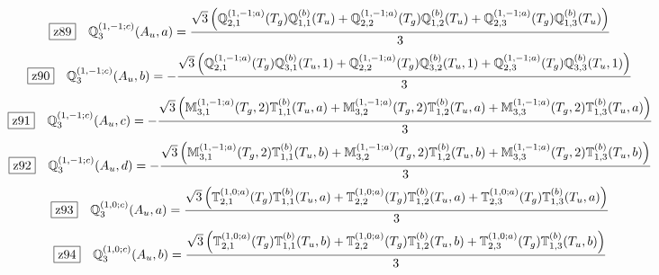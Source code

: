 \documentclass[fleqn,10pt,landscape]{jsarticle}
\begin{document}
\begin{dmath*}
\hspace*{3mm}\fbox{z89}\quad \mathbb{Q}_{3}^{(1,-1;c)}(A_{u},a)=\frac{\sqrt{3} \left(\mathbb{Q}_{2,1}^{(1,-1;a)}(T_{g}) \mathbb{Q}_{1,1}^{(b)}(T_{u}) + \mathbb{Q}_{2,2}^{(1,-1;a)}(T_{g}) \mathbb{Q}_{1,2}^{(b)}(T_{u}) + \mathbb{Q}_{2,3}^{(1,-1;a)}(T_{g}) \mathbb{Q}_{1,3}^{(b)}(T_{u})\right)}{3}
\end{dmath*}
\begin{dmath*}
\hspace*{3mm}\fbox{z90}\quad \mathbb{Q}_{3}^{(1,-1;c)}(A_{u},b)=- \frac{\sqrt{3} \left(\mathbb{Q}_{2,1}^{(1,-1;a)}(T_{g}) \mathbb{Q}_{3,1}^{(b)}(T_{u},1) + \mathbb{Q}_{2,2}^{(1,-1;a)}(T_{g}) \mathbb{Q}_{3,2}^{(b)}(T_{u},1) + \mathbb{Q}_{2,3}^{(1,-1;a)}(T_{g}) \mathbb{Q}_{3,3}^{(b)}(T_{u},1)\right)}{3}
\end{dmath*}
\begin{dmath*}
\hspace*{3mm}\fbox{z91}\quad \mathbb{Q}_{3}^{(1,-1;c)}(A_{u},c)=- \frac{\sqrt{3} \left(\mathbb{M}_{3,1}^{(1,-1;a)}(T_{g},2) \mathbb{T}_{1,1}^{(b)}(T_{u},a) + \mathbb{M}_{3,2}^{(1,-1;a)}(T_{g},2) \mathbb{T}_{1,2}^{(b)}(T_{u},a) + \mathbb{M}_{3,3}^{(1,-1;a)}(T_{g},2) \mathbb{T}_{1,3}^{(b)}(T_{u},a)\right)}{3}
\end{dmath*}
\begin{dmath*}
\hspace*{3mm}\fbox{z92}\quad \mathbb{Q}_{3}^{(1,-1;c)}(A_{u},d)=- \frac{\sqrt{3} \left(\mathbb{M}_{3,1}^{(1,-1;a)}(T_{g},2) \mathbb{T}_{1,1}^{(b)}(T_{u},b) + \mathbb{M}_{3,2}^{(1,-1;a)}(T_{g},2) \mathbb{T}_{1,2}^{(b)}(T_{u},b) + \mathbb{M}_{3,3}^{(1,-1;a)}(T_{g},2) \mathbb{T}_{1,3}^{(b)}(T_{u},b)\right)}{3}
\end{dmath*}
\begin{dmath*}
\hspace*{3mm}\fbox{z93}\quad \mathbb{Q}_{3}^{(1,0;c)}(A_{u},a)=\frac{\sqrt{3} \left(\mathbb{T}_{2,1}^{(1,0;a)}(T_{g}) \mathbb{T}_{1,1}^{(b)}(T_{u},a) + \mathbb{T}_{2,2}^{(1,0;a)}(T_{g}) \mathbb{T}_{1,2}^{(b)}(T_{u},a) + \mathbb{T}_{2,3}^{(1,0;a)}(T_{g}) \mathbb{T}_{1,3}^{(b)}(T_{u},a)\right)}{3}
\end{dmath*}
\begin{dmath*}
\hspace*{3mm}\fbox{z94}\quad \mathbb{Q}_{3}^{(1,0;c)}(A_{u},b)=\frac{\sqrt{3} \left(\mathbb{T}_{2,1}^{(1,0;a)}(T_{g}) \mathbb{T}_{1,1}^{(b)}(T_{u},b) + \mathbb{T}_{2,2}^{(1,0;a)}(T_{g}) \mathbb{T}_{1,2}^{(b)}(T_{u},b) + \mathbb{T}_{2,3}^{(1,0;a)}(T_{g}) \mathbb{T}_{1,3}^{(b)}(T_{u},b)\right)}{3}
\end{dmath*}
\end{document}
